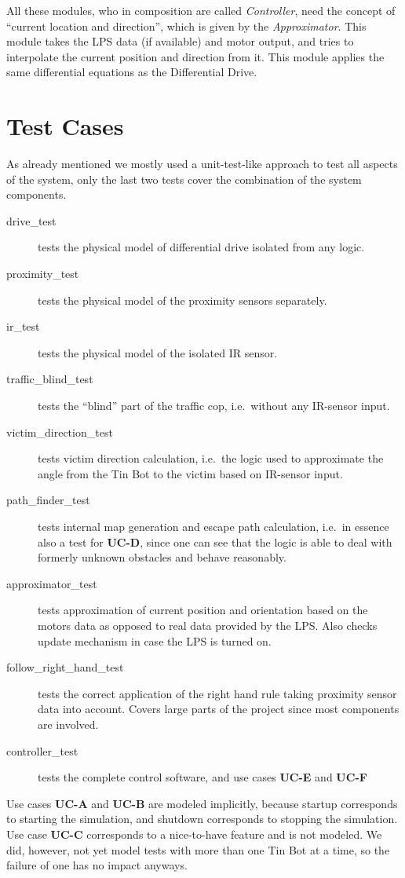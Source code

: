 \documentclass[a4paper,parskip,headheight=38pt]{scrartcl} %
\begin{document}
All these modules, who in composition are called \emph{Controller}, need the concept of \enquote{current location and direction}, which is given by the \emph{Approximator}. This module takes the LPS data (if available) and motor output, and tries to interpolate the current position and direction from it. This module applies the same differential equations as the Differential Drive.

\section{Test Cases}
As already mentioned we mostly used a unit-test-like approach to test all aspects of the system, only the last two tests cover the combination of the system components.

\begin{description}
\item[drive\_test] tests the physical model of differential drive isolated from any logic.
\item[proximity\_test] tests the physical model of the proximity sensors separately. %
\item[ir\_test] tests the physical model of the isolated IR sensor.
\item[traffic\_blind\_test] tests the \enquote{blind} part of the traffic cop, i.e.\ without any IR-sensor input.
\item[victim\_direction\_test] tests victim direction calculation, i.e.\ the logic used to approximate the angle from the Tin Bot to the victim based on IR-sensor input.
\item[path\_finder\_test] tests internal map generation and escape path calculation, i.e.\ in essence also a test for \textbf{UC-D}, since one can see that the logic is able to deal with formerly unknown obstacles and behave reasonably.
\item[approximator\_test] tests approximation of current position and orientation based on the motors data as opposed to real data provided by the LPS. Also checks update mechanism in case the LPS is turned on.
\item[follow\_right\_hand\_test] tests the correct application of the right hand rule taking proximity sensor data into account. Covers large parts of the project since most components are involved.
\item[controller\_test] tests the complete control software, and use cases \textbf{UC-E} and \textbf{UC-F}
\end{description}


Use cases \textbf{UC-A} and \textbf{UC-B} are modeled implicitly, because startup corresponds to starting the simulation, and shutdown corresponds to stopping the simulation.
Use case \textbf{UC-C} corresponds to a nice-to-have feature and is not modeled. We did, however, not yet model tests with more than one Tin Bot at a time, so the failure of one has no impact anyways.
\end{document}
